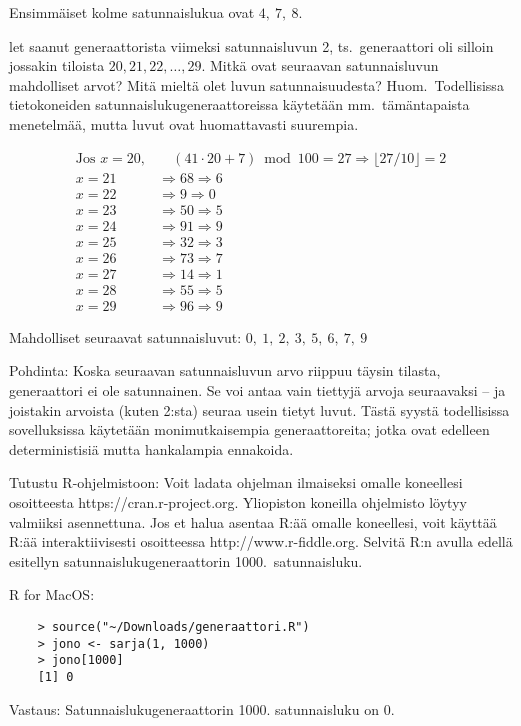 \documentclass[12pt,a4paper]{article}
\begin{document}
\begin{kohta}
  Ensimmäiset kolme satunnaislukua ovat \(4,\ 7,\ 8\).
\pagebreak
  \item let saanut generaattorista viimeksi satunnaisluvun 2, ts.\ 
generaattori oli silloin jossakin tiloista \linebreak $20,21,22,\ldots, 29$.
Mitkä ovat seuraavan satunnaisluvun mahdolliset arvot? Mitä mieltä olet 
luvun satunnaisuudesta? Huom.\ Todellisissa tietokoneiden 
satunnaislukugeneraattoreissa käytetään mm.\ tämäntapaista menetelmää, mutta 
luvut ovat huomattavasti suurempia.

  \begin{align*}
  \text{Jos } x = 20, &\quad (41 \cdot 20 + 7) \bmod 100 = 27 \Rightarrow \lfloor 27/10 \rfloor = 2 \\
  x = 21 &\Rightarrow 68 \Rightarrow 6 \\
  x = 22 &\Rightarrow 9  \Rightarrow 0 \\
  x = 23 &\Rightarrow 50 \Rightarrow 5 \\
  x = 24 &\Rightarrow 91 \Rightarrow 9 \\
  x = 25 &\Rightarrow 32 \Rightarrow 3 \\
  x = 26 &\Rightarrow 73 \Rightarrow 7 \\
  x = 27 &\Rightarrow 14 \Rightarrow 1 \\
  x = 28 &\Rightarrow 55 \Rightarrow 5 \\
  x = 29 &\Rightarrow 96 \Rightarrow 9
  \end{align*}

  Mahdolliset seuraavat satunnaisluvut: \(0,\ 1,\ 2,\ 3,\ 5,\ 6,\ 7,\ 9\)

  Pohdinta: Koska seuraavan satunnaisluvun arvo riippuu täysin
  tilasta, generaattori ei ole satunnainen.
  Se voi antaa vain tiettyjä arvoja seuraavaksi --
  ja joistakin arvoista (kuten 2:sta) seuraa usein
  tietyt luvut. Tästä syystä todellisissa sovelluksissa
  käytetään monimutkaisempia generaattoreita; jotka ovat
  edelleen deterministisiä mutta hankalampia ennakoida.

  \item Tutustu R-ohjelmistoon: Voit ladata ohjelman ilmaiseksi omalle 
koneellesi osoitteesta https://cran.r-project.org. Yliopiston koneilla ohjelmisto 
löytyy valmiiksi asennettuna. Jos et halua asentaa R:ää omalle koneellesi,
voit käyttää R:ää interaktiivisesti osoitteessa http://www.r-fiddle.org.
Selvitä R:n avulla edellä esitellyn satunnaislukugeneraattorin 1000.\
satunnaisluku. 
\vspace{0.8cm}

  R for MacOS:
  \begin{verbatim}
    > source("~/Downloads/generaattori.R")
    > jono <- sarja(1, 1000)
    > jono[1000]
    [1] 0
  \end{verbatim}

  Vastaus: Satunnaislukugeneraattorin 1000. satunnaisluku on 0.

\end{kohta}
\end{document}
